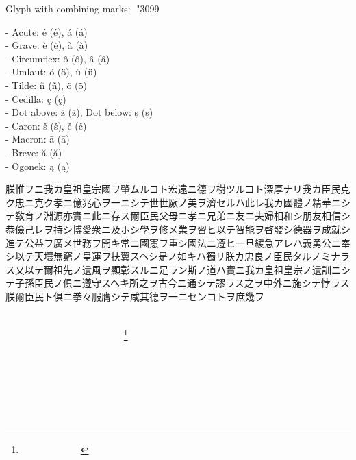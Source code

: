\documentclass[a5paper, 10pt, openany]{book} %
\begin{document}
Glyph with combining marks: \char"3099\







- Acute: \'e (é), \'a (á) \\
- Grave: \`e (è), \`a (à) \\
- Circumflex: \^o (ô), \^a (â) \\
- Umlaut: \"o (ö), \"u (ü) \\
- Tilde: \~n (ñ), \~o (õ) \\
- Cedilla: \c{c} (ç) \\
- Dot above: \.{z} (ż), Dot below: \d{s} (ṣ) \\
- Caron: \v{s} (š), \v{c} (č) \\
- Macron: \={a} (ā) \\
- Breve: \u{a} (ă) \\
- Ogonek: \k{a} (ą)


 
朕惟フニ我カ皇祖皇宗國ヲ肇ムルコト宏遠ニ德ヲ樹ツルコト深厚ナリ我カ臣民克ク忠ニ克ク孝ニ億兆心ヲ一ニシテ世世厥ノ美ヲ濟セルハ此レ我カ國體ノ精華ニシテ敎育ノ淵源亦實ニ此ニ存ス爾臣民父母ニ孝ニ兄弟ニ友ニ夫婦相和シ朋友相信シ恭儉己レヲ持シ博愛衆ニ及ホシ學ヲ修メ業ヲ習ヒ以テ智能ヲ啓發シ德器ヲ成就シ進テ公益ヲ廣メ世務ヲ開キ常ニ國憲ヲ重シ國法ニ遵ヒ一旦緩急アレハ義勇公ニ奉シ以テ天壤無窮ノ皇運ヲ扶翼スヘシ是ノ如キハ獨リ朕カ忠良ノ臣民タルノミナラス又以テ爾祖先ノ遺風ヲ顯彰スルニ足ラン斯ノ道ハ實ニ我カ皇祖皇宗ノ遺訓ニシテ子孫臣民ノ俱ニ遵守スヘキ所之ヲ古今ニ通シテ謬ラス之ヲ中外ニ施シテ悖ラス朕爾臣民ト俱ニ拳々服膺シテ咸其德ヲ一ニセンコトヲ庶幾フ

  󱍑  󰼐󱑡  󱍑  󰼐󱑡  󱍑  󰼐󱑡  󱍑  󰼐󱑡  󱍑  󰼐󱑡  󱍑  󰼐󱑡  󱍑  󰼐󱑡  󱍑  󰼐󱑡  󱍑  󰼐󱑡  󱍑  󰼐󱑡  󱍑 \footnote{ 󰼐󱑡  󱍑  󰼐󱑡}
  󱍑  󰼐󱑡  󱍑  󰼐󱑡  󱍑  󰼐󱑡  󱍑  󰼐󱑡  󱍑  󰼐󱑡  󱍑  󰼐󱑡  󱍑  󰼐󱑡  󱍑  󰼐󱑡  󱍑  󰼐󱑡  󱍑  󰼐󱑡  󱍑  󰼐󱑡  󱍑  󰼐󱑡
  󱍑  󰼐󱑡  󱍑  󰼐󱑡  󱍑  󰼐󱑡  󱍑  󰼐󱑡  󱍑  󰼐󱑡  󱍑  󰼐󱑡  󱍑  󰼐󱑡  󱍑  󰼐󱑡  󱍑  󰼐󱑡  󱍑  󰼐󱑡  󱍑  󰼐󱑡  󱍑  󰼐󱑡
  󱍑  󰼐󱑡  󱍑  󰼐󱑡  󱍑  󰼐󱑡  󱍑  󰼐󱑡  󱍑  󰼐󱑡  󱍑  󰼐󱑡  󱍑  󰼐󱑡  󱍑  󰼐󱑡  󱍑  󰼐󱑡  󱍑  󰼐󱑡  󱍑  󰼐󱑡  󱍑  󰼐󱑡
  󱍑  󰼐󱑡  󱍑  󰼐󱑡  󱍑  󰼐󱑡  󱍑  󰼐󱑡  󱍑  󰼐󱑡  󱍑  󰼐󱑡  󱍑  󰼐󱑡  󱍑  󰼐󱑡  󱍑  󰼐󱑡  󱍑  󰼐󱑡  󱍑  󰼐󱑡  󱍑  󰼐󱑡\\
\end{document}
